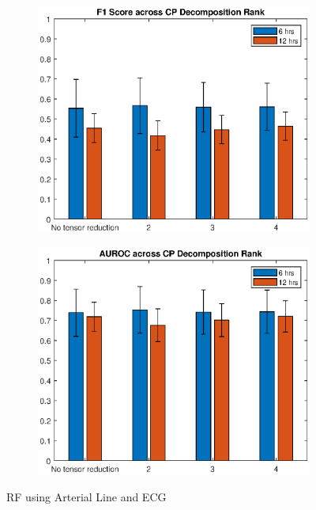 \begin{figure}[htb]
    \centering
    \begin{subfigure}[htb]{0.49\textwidth}
        \includegraphics[width=\textwidth]{body/figures/sigOnlyRF_f1.eps}
    \end{subfigure}
    \hfill
    \begin{subfigure}[htb]{0.49\textwidth}
        \includegraphics[width=\textwidth]{body/figures/sigOnlyRF_auc.eps}
    \end{subfigure}
    \caption{RF using Arterial Line and ECG}
    \label{fig:rf_sigonly}
\end{figure}  %

